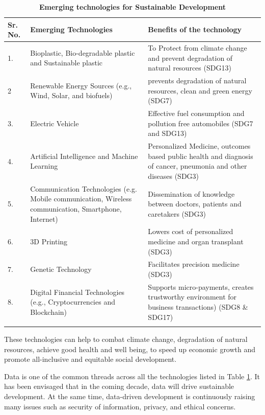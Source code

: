 \documentclass[10pt]{IETBook}
\begin{document}
\begin{longtable}{|p{0.13in}|p{1.45in}|p{2.6in}|}\hline
			{\bf Sr. No.} & {\bf Emerging Technologies} & {\bf Benefits of the technology} \\ \hline
			1. & Bioplastic, Bio-degradable plastic and Sustainable plastic & To Protect from climate change and prevent degradation of natural resources (SDG13) \\ \hline
			
			2 & Renewable Energy Sources (e.g., Wind, Solar, and biofuels) & prevents degradation of natural resources, clean and green energy (SDG7)\\ \hline
			
			3. & Electric Vehicle & Effective fuel consumption and pollution free automobiles (SDG7 and SDG13)\\ \hline
			
			4. & Artificial Intelligence and Machine Learning & Personalized Medicine, outcomes based public health and diagnosis of cancer, pneumonia and other diseases (SDG3) \\ \hline
			
			5.& Communication Technologies (e.g. Mobile communication, Wireless communication, Smartphone, Internet) & Dissemination of knowledge between doctors, patients and caretakers (SDG3) \\ \hline 
			
			6. & 3D Printing & Lowers cost of personalized medicine and organ transplant (SDG3)\\ \hline
			
			7. & Genetic Technology & Facilitates precision medicine (SDG3)\\ \hline
			
			8. & Digital Financial Technologies (e.g., Cryptocurrencies and Blockchain) & Supports micro-payments, creates trustworthy environment for business transactions) (SDG8 \& SDG17)\\ \hline 
			
		\caption{\bf Emerging technologies for Sustainable Development} \label{tech}
\end{longtable}


These technologies can help to combat climate change, degradation of natural resources, achieve good health and well being, to speed up economic growth and promote all-inclusive and equitable social development.

Data is one of the common threads across all the technologies listed in Table \ref{tech}. It has been envisaged that in the coming decade, data will drive sustainable development. At the same time, data-driven development is continuously raising many issues such as security of information, privacy, and ethical concerns.
\end{document}

